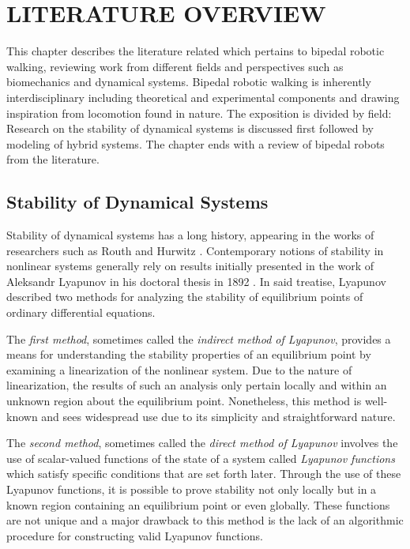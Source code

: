 \chapter{\uppercase{Literature Overview}}

This chapter describes the literature related which pertains to bipedal robotic
walking, reviewing work from different fields and perspectives such as
biomechanics and dynamical systems.
%
Bipedal robotic walking is inherently interdisciplinary including theoretical
and experimental components and drawing inspiration from locomotion found in
nature.
%
The exposition is divided by field:
%
Research on the stability of dynamical systems is discussed first followed by
modeling of hybrid systems.
%
The chapter ends with a review of bipedal robots from the literature.

\section{Stability of Dynamical Systems}

Stability of dynamical systems has a long history, appearing in the works of
researchers such as Routh \cite{Routh1877} and Hurwitz \cite{Hurwitz1895}.
%
Contemporary notions of stability in nonlinear systems generally rely on results
initially presented in the work of Aleksandr Lyapunov in his doctoral thesis in
1892 \cite{Lyapunov1992}.
%
In said treatise, Lyapunov described two methods for analyzing the stability of
equilibrium points of ordinary differential equations.

The {\em first method}, sometimes called the {\em indirect method of Lyapunov},
provides a means for understanding the stability properties of an equilibrium
point by examining a linearization of the nonlinear system.
%
Due to the nature of linearization, the results of such an analysis only pertain
locally and within an unknown region about the equilibrium point.
%
Nonetheless, this method is well-known and sees widespread use due to its
simplicity and straightforward nature.
%

The {\em second method}, sometimes called the {\em direct method of Lyapunov}
involves the use of scalar-valued functions of the state of a system called {\em
  Lyapunov functions} which satisfy specific conditions that are set forth
later.
%
Through the use of these Lyapunov functions, it is possible to prove
stability not only locally but in a known region containing an equilibrium point
or even globally.
%
These functions are not unique and a major drawback to this method is the lack
of an algorithmic procedure for constructing valid Lyapunov functions.

